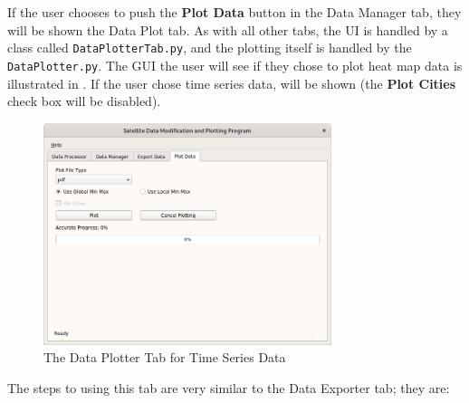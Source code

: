 \documentclass[../00_main.tex]{subfiles}
\begin{document}
If the user chooses to push the \textbf{Plot Data} button in the Data Manager
tab, they will be shown the Data Plot tab. As with all other tabs, the UI is
handled by a class called \texttt{DataPlotterTab.py}, and the plotting itself is
handled by the \texttt{DataPlotter.py}. The GUI the user will see if they chose
to plot heat map data is illustrated in . If the user chose time
series data,  will be shown (the \textbf{Plot Cities} check box
will be disabled). 
\begin{figure}[H]
    \center
    \includegraphics[width=0.75\textwidth]{../graphics/dpl02}
    \caption{The Data Plotter Tab for Time Series Data}
    \label{dpl02}
\end{figure}
The steps to using this tab are very similar to the Data
Exporter tab; they are:
\end{document}
